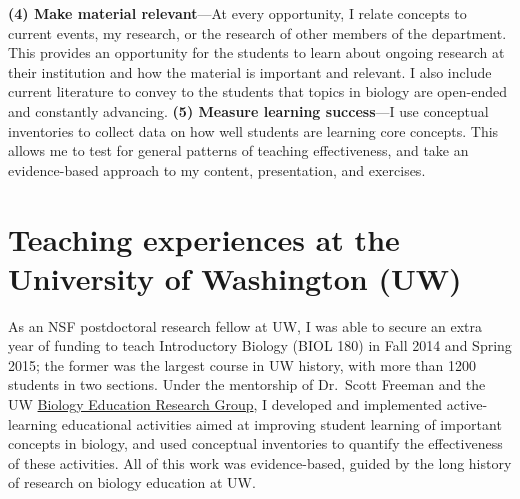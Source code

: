 \textbf{(4) Make material relevant}---At every opportunity, I relate concepts
to current events, my research, or the research of other members of the
department.
This provides an opportunity for the students to learn about ongoing
research at their institution and how the material is important and relevant.
I also include current literature to convey to the students that topics in
biology are open-ended and constantly advancing.
\textbf{(5) Measure learning success}---I use conceptual inventories to
collect
data on how well students are learning core concepts.
This allows me to test for general patterns of teaching effectiveness, and take
an evidence-based approach to my content, presentation, and exercises.

\section*{Teaching experiences at the University of Washington (UW)}
As an NSF postdoctoral research fellow at UW,
I was able to secure an extra year of funding to teach
Introductory Biology
(BIOL 180) in Fall 2014 and Spring 2015;
the former was the largest course in UW history, with more than 1200 students
in two sections.
Under the mentorship of Dr.\ Scott Freeman and the UW
\href{https://sites.google.com/site/uwbioedresgroup/home}{Biology Education
    Research Group}, I developed and implemented active-learning
educational activities aimed at improving student learning of important
concepts in biology,
and used conceptual inventories to quantify the effectiveness of these
activities.
All of this work was evidence-based, guided by the long history of research on
biology education at UW.

